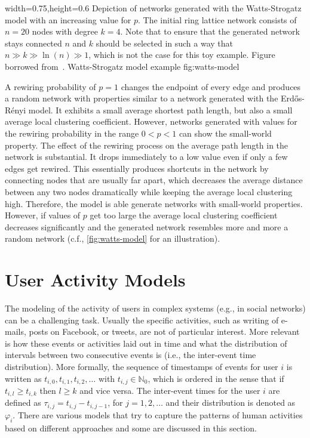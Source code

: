       {width=0.75\textwidth,height=0.6\textheight}
      {Depiction of networks generated with the Watts-Strogatz model with an increasing value for \( p \). The initial ring lattice network consists of \( n = 20 \) nodes with degree \( k = 4 \). Note that to ensure that the generated network stays connected \( n \) and \( k \) should be selected in such a way that \( n \gg k \gg \ln(n) \gg 1 \), which is not the case for this toy example. Figure borrowed from~\cite{Watts1998}.}
      {Watts-Strogatz model example}
      {fig:watts-model}


A rewiring probability of \( p = 1 \) changes the endpoint of every edge and produces a random network with properties similar to a network generated with the Erdős-Rényi model.
It exhibits a small average shortest path length, but also a small average local clustering coefficient.
However, networks generated with values for the rewiring probability in the range \( 0 < p < 1 \) can show the small-world property.
The effect of the rewiring process on the average path length in the network is substantial.
It drops immediately to a low value even if only a few edges get rewired.
This essentially produces shortcuts in the network by connecting nodes that are usually far apart, which decreases the average distance between any two nodes dramatically while keeping the average local clustering high.
Therefore, the model is able generate networks with small-world properties.
However, if values of \( p \) get too large the average local clustering coefficient decreases significantly and the generated network resembles more and more a random network (c.f., \cref{fig:watts-model} for an illustration).




\section{User Activity Models}
\label{sec:user-activity-models}

The modeling of the activity of users in complex systems (e.g., in social networks) can be a challenging task.
Usually the specific activities, such as writing of e-mails, posts on  Facebook, or tweets, are not of particular interest.
More relevant is how these events or activities laid out in time and what the distribution of intervals between two consecutive events is (i.e., the inter-event time distribution).
More formally, the sequence of timestamps of events for user \( i \) is written as \(t_{i,0}, t_{i,1}, t_{i,2}, \ldots \) with \( t_{i,j} \in \mathbb{N}_0 \), which is ordered in the sense that if \( t_{i,l} \ge  t_{i,k} \) then \( l \ge k \) and vice versa.
The inter-event times for the user \( i \) are defined as \( \tau_{i,j} = t_{i,j} - t_{i,j-1} \), for \(j = 1, 2, \ldots \) and their distribution is denoted as \( \varphi_{i} \).
There are various models that try to capture the patterns of human activities based on different approaches and some are discussed in this section.


